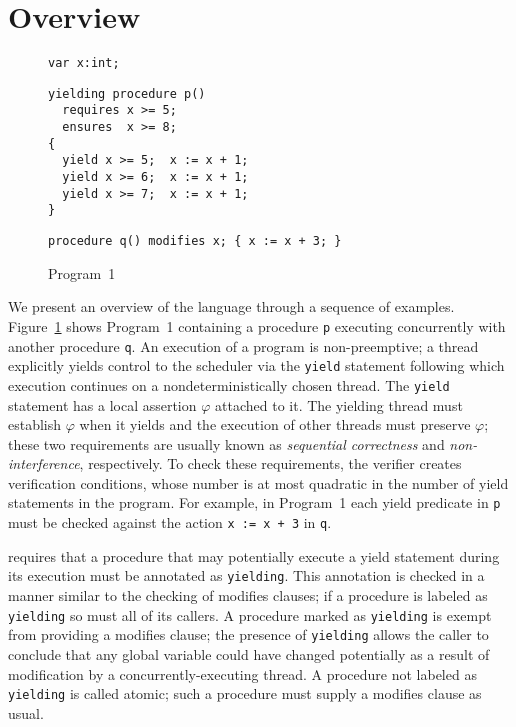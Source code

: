 \section{Overview}
\label{sec:overview}
\begin{figure}
\begin{verbatim}
var x:int;
\end{verbatim}
\begin{verbatim}
yielding procedure p()
  requires x >= 5;
  ensures  x >= 8;
{
  yield x >= 5;  x := x + 1;
  yield x >= 6;  x := x + 1;
  yield x >= 7;  x := x + 1;
}
\end{verbatim}
\begin{verbatim}
procedure q() modifies x; { x := x + 3; }
\end{verbatim}
\caption{Program~1}
\label{fig:ex1}
\end{figure}

We present an overview of the \civl language through a sequence of examples.
Figure~\ref{fig:ex1} shows Program~1 containing a procedure {\tt p}
executing concurrently with another procedure {\tt q}. 
An execution of a \civl program is non-preemptive; a thread explicitly yields control to the
scheduler via the {\tt yield} statement following which execution continues on a 
nondeterministically chosen thread.
The {\tt yield} statement has a local assertion $\varphi$ attached to it.
The yielding thread must establish $\varphi$ when it yields and the execution of other threads 
must preserve $\varphi$; these two requirements are usually known as {\em sequential correctness}
and {\em non-interference}, respectively.
To check these requirements, the \civl verifier creates verification conditions, whose number is at most
quadratic in the number of yield statements in the program.
For example, in Program~1 each yield predicate in {\tt p} must be checked against the action 
{\tt x := x + 3} in {\tt q}.

\civl requires that a procedure that may potentially execute a yield statement during its execution 
must be annotated as {\tt yielding}.
This annotation is checked in a manner similar to the checking of modifies clauses; if a procedure is labeled 
as {\tt yielding} so must all of its callers.
A procedure marked as {\tt yielding} is exempt from providing a modifies clause; 
the presence of {\tt yielding} allows the caller to conclude that any global variable could have changed
potentially as a result of modification by a concurrently-executing thread.
A procedure not labeled as {\tt yielding} is called atomic; such a procedure must supply a modifies clause as usual.


